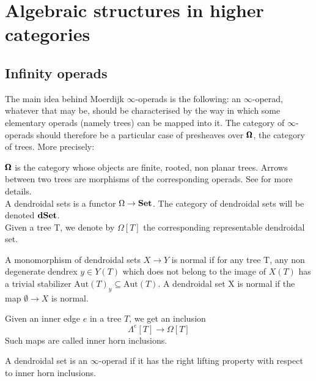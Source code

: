 \chapter{Algebraic structures in higher categories}

\begin{refsection}

\label{weak structures}

\section{Infinity operads}

The main idea behind Moerdijk $\infty$-operads is the following: an $\infty$-operad, whatever that may be, should be characterised by the way in which some elementary operads (namely trees) can be mapped into it. The category of $\infty$-operads should therefore be a particular case of presheaves over $\pmb{\Omega}$, the category of trees. More precisely:

\begin{definition}
$\pmb{\Omega}$ is the category whose objects are finite, rooted, non planar trees. Arrows between two trees are morphisms of the corresponding operads. See \cite{Mo-We}
for more details.\\
A dendroidal sets is a functor $\Omega\to \mathbf{Set}$. The category of dendroidal sets will be denoted $\mathbf{dSet}$.\\
Given a tree T, we denote by $\Omega[T]$ the corresponding representable dendroidal set.
\end{definition}

\begin{definition}[\cite{Mo-We}]
A monomorphism of dendroidal sets $X\to Y$ is normal if for any tree T, any non degenerate dendrex $y \in Y (T)$ which does not belong to the image of $X(T)$ has a trivial stabilizer $\mathrm{Aut}(T)_y \subseteq \mathrm{Aut}(T)$. A dendroidal set X is normal if the map $\emptyset\to X$ is normal.
\end{definition}

Given an inner edge $e$ in a tree $T$, we get an inclusion
\[
\Lambda^e[T]\to \Omega[T]
\]
Such maps are called inner horn inclusions.

\begin{definition}
A dendroidal set is an $\infty$-operad if it has the right lifting property with respect to inner horn inclusions.
\end{definition}


\end{refsection}
